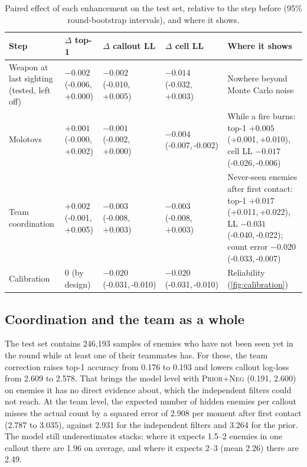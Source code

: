 \documentclass[11pt]{article}
\newcommand{\model}[1]{\textsc{#1}}
\newcommand{\pd}[2]{{\scriptsize(#1,\,#2)}}
\newcommand{\1}{\mathbb{1}}
\begin{document}
\begin{table}[t]
\centering
\caption{Paired effect of each enhancement on the test set, relative to the step before (95\% round-bootstrap intervals), and where it shows.}
\label{tab:enhance}
\small
\setlength{\tabcolsep}{4pt}
\begin{tabular}{@{}>{\raggedright\arraybackslash}p{2.55cm}lll>{\raggedright\arraybackslash}p{4.0cm}@{}}
\toprule
Step & $\Delta$ top-1 & $\Delta$ callout LL & $\Delta$ cell LL & Where it shows \\
\midrule
Weapon at last sighting (tested, left off) & $-0.002$ \pd{-0.006}{+0.000} & $-0.002$ \pd{-0.010}{+0.005} & $-0.014$ \pd{-0.032}{+0.003} & Nowhere beyond Monte Carlo noise \\[2pt]
Molotovs & $+0.001$ \pd{-0.000}{+0.002} & $-0.001$ \pd{-0.002}{+0.000} & $-0.004$ \pd{-0.007}{-0.002} & While a fire burns: top-1 $+0.005$ \pd{+0.001}{+0.010}, cell LL $-0.017$ \pd{-0.026}{-0.006} \\[2pt]
Team coordination & $+0.002$ \pd{-0.001}{+0.005} & $-0.003$ \pd{-0.008}{+0.003} & $-0.003$ \pd{-0.008}{+0.003} & Never-seen enemies after first contact: top-1 $+0.017$ \pd{+0.011}{+0.022}, LL $-0.031$ \pd{-0.040}{-0.022}; count error $-0.020$ \pd{-0.033}{-0.007} \\[2pt]
Calibration & 0 (by design) & $-0.020$ \pd{-0.031}{-0.010} & $-0.020$ \pd{-0.031}{-0.010} & Reliability (\cref{fig:calibration}) \\
\bottomrule
\end{tabular}
\end{table}

\subsection{Coordination and the team as a whole}
\label{sec:res-team}
The test set contains 246{,}193 samples of enemies who have not been seen yet in the round while at least one of their teammates has. For these, the team correction raises top-1 accuracy from 0.176 to 0.193 and lowers callout log-loss from 2.609 to 2.578. That brings the model level with \model{Prior+Neg} (0.191, 2.600) on enemies it has no direct evidence about, which the independent filters could not reach. At the team level, the expected number of hidden enemies per callout misses the actual count by a squared error of 2.908 per moment after first contact (2.787 to 3.035), against 2.931 for the independent filters and 3.264 for the prior. The model still underestimates stacks: where it expects 1.5--2 enemies in one callout there are 1.96 on average, and where it expects 2--3 (mean 2.26) there are 2.49.
\end{document}
